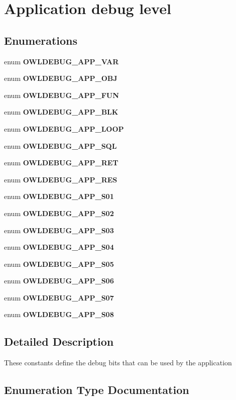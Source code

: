 \section{Application debug level}
\label{group__DEBUG__ApplicLevel}
\subsection*{Enumerations}
\begin{DoxyCompactItemize}
\item 
enum {\bf OWLDEBUG\_\-APP\_\-VAR} 
\item 
enum {\bf OWLDEBUG\_\-APP\_\-OBJ} 
\item 
enum {\bf OWLDEBUG\_\-APP\_\-FUN} 
\item 
enum {\bf OWLDEBUG\_\-APP\_\-BLK} 
\item 
enum {\bf OWLDEBUG\_\-APP\_\-LOOP} 
\item 
enum {\bf OWLDEBUG\_\-APP\_\-SQL} 
\item 
enum {\bf OWLDEBUG\_\-APP\_\-RET} 
\item 
enum {\bf OWLDEBUG\_\-APP\_\-RES} 
\item 
enum {\bf OWLDEBUG\_\-APP\_\-S01} 
\item 
enum {\bf OWLDEBUG\_\-APP\_\-S02} 
\item 
enum {\bf OWLDEBUG\_\-APP\_\-S03} 
\item 
enum {\bf OWLDEBUG\_\-APP\_\-S04} 
\item 
enum {\bf OWLDEBUG\_\-APP\_\-S05} 
\item 
enum {\bf OWLDEBUG\_\-APP\_\-S06} 
\item 
enum {\bf OWLDEBUG\_\-APP\_\-S07} 
\item 
enum {\bf OWLDEBUG\_\-APP\_\-S08} 
\end{DoxyCompactItemize}


\subsection{Detailed Description}
These constants define the debug bits that can be used by the application 

\subsection{Enumeration Type Documentation}
